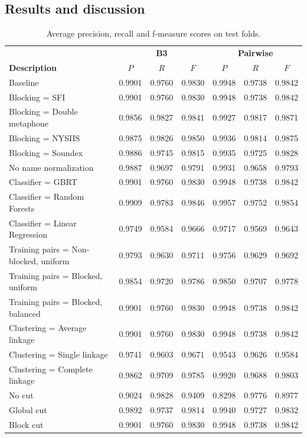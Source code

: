 \documentclass{article}
\begin{document}
\subsection{Results and discussion}

\begin{table}
\caption{Average precision, recall and f-measure scores on test folds.}
\label{table:results}
\centering
\begin{tabular}{|l|c c c|c c c|}
  \hline
                       & \multicolumn{3}{|c|}{\textbf{B3}} & \multicolumn{3}{|c|}{\textbf{Pairwise}} \\
  \textbf{Description} & $P$ & $R$ & $F$ & $P$ & $R$ & $F$\\
  \hline
  \hline
Baseline & 0.9901 & 0.9760 & 0.9830 & 0.9948 & 0.9738 & 0.9842 \\
\hline
Blocking = SFI & 0.9901 & 0.9760 & 0.9830 & 0.9948 & 0.9738 & 0.9842 \\
Blocking = Double metaphone & 0.9856 & 0.9827 & 0.9841 & 0.9927 & 0.9817 & 0.9871 \\
Blocking = NYSIIS & 0.9875 & 0.9826 & 0.9850 & 0.9936 & 0.9814 & 0.9875 \\
Blocking = Soundex & 0.9886 & 0.9745 & 0.9815 & 0.9935 & 0.9725 & 0.9828 \\
\hline
No name normalization & 0.9887 & 0.9697 & 0.9791 & 0.9931 & 0.9658 & 0.9793 \\
\hline
Classifier = GBRT & 0.9901 & 0.9760 & 0.9830 & 0.9948 & 0.9738 & 0.9842 \\
Classifier = Random Forests & 0.9909 & 0.9783 & 0.9846 & 0.9957 & 0.9752 & 0.9854 \\
Classifier = Linear Regression & 0.9749 & 0.9584 & 0.9666 & 0.9717 & 0.9569 & 0.9643 \\
\hline
Training pairs = Non-blocked, uniform & 0.9793 & 0.9630 & 0.9711 & 0.9756 & 0.9629 & 0.9692 \\
Training pairs = Blocked, uniform & 0.9854 & 0.9720 & 0.9786 & 0.9850 & 0.9707 & 0.9778 \\
Training pairs = Blocked, balanced & 0.9901 & 0.9760 & 0.9830 & 0.9948 & 0.9738 & 0.9842 \\
\hline
Clustering = Average linkage & 0.9901 & 0.9760 & 0.9830 & 0.9948 & 0.9738 & 0.9842 \\
Clustering = Single linkage & 0.9741 & 0.9603 & 0.9671 & 0.9543 & 0.9626 & 0.9584 \\
Clustering = Complete linkage & 0.9862 & 0.9709 & 0.9785 & 0.9920 & 0.9688 & 0.9803 \\
\hline
No cut & 0.9024 & 0.9828 & 0.9409 & 0.8298 & 0.9776 & 0.8977 \\
Global cut & 0.9892 & 0.9737 & 0.9814 & 0.9940 & 0.9727 & 0.9832 \\
Block cut & 0.9901 & 0.9760 & 0.9830 & 0.9948 & 0.9738 & 0.9842 \\
  \hline
\end{tabular}
\end{table}
\end{document}
